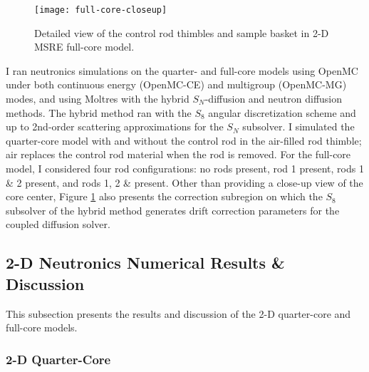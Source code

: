 \begin{figure}[htb!]
  \centering
  \texttt{[image: full-core-closeup]}
  \caption{Detailed view of the control rod thimbles and sample basket in 2-D \gls{MSRE} full-core
    model.}
  \label{fig:full-geom-closeup}
\end{figure}

I ran neutronics simulations on the quarter- and full-core models using OpenMC under both continuous
energy (OpenMC-CE) and multigroup (OpenMC-MG) modes, and using Moltres with the hybrid $S_N$-diffusion
and neutron diffusion methods. The hybrid method ran with the $S_8$ angular discretization scheme
and up to 2nd-order scattering approximations for the $S_N$ subsolver. I simulated the
quarter-core model with and without the control rod in the air-filled rod thimble; air replaces the
control rod material when the rod is removed. For the full-core model, I considered four rod
configurations: no rods present, rod 1 present, rods 1 \& 2 present, and rods 1, 2 \& present.
Other than providing a close-up view of the core center, Figure \ref{fig:full-geom-closeup} also
presents the correction subregion on which the $S_8$ subsolver of the hybrid method generates
drift correction parameters for the coupled diffusion solver.

\FloatBarrier

\subsection{2-D Neutronics Numerical Results \& Discussion} \label{sec:2d-nts-results}

This subsection presents the results and discussion of the 2-D quarter-core and full-core models.

\subsubsection{2-D Quarter-Core}

